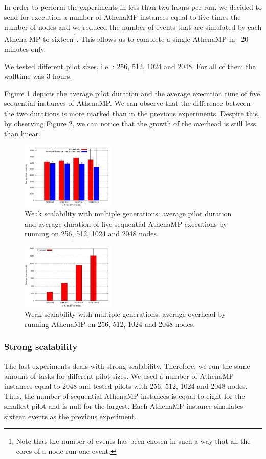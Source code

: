 In order to perform the experiments in less than two hours per run, we decided to send for execution a number of AthenaMP instances equal to five times the number of nodes and we reduced  the number of events that are simulated by each Athena-MP to sixteen\footnote{Note that the number of events has been chosen in such a way that all the cores of a node run one event.}. This allows us to complete a single AthenaMP in ~20 minutes only. 

We tested different pilot sizes, i.e. : 256, 512, 1024 and 2048. For all of them the walltime was 3 hours. 

Figure \ref{fig:weakScal2a} depicts the average pilot duration and  the average execution time of five sequential instances of AthenaMP.  
We can observe that the difference between the two durations is more marked than in the previous experiments. Despite this, by observing Figure \ref{fig:weakScal2b}, we can notice that the growth of the overhead is still less than linear.

\begin{figure}[!htb]
        \includegraphics[width=0.4\textwidth]{./figures/NGE/weakET2.pdf}
    \caption{Weak scalability with multiple generations: average pilot duration and average duration of five sequential AthenaMP executions by running on 256, 512, 1024 and 2048 nodes.}
\label{fig:weakScal2a}
\end{figure}
\begin{figure}[!htb]
        \includegraphics[width=0.4\textwidth]{./figures/NGE/weakOver2.pdf}
    \caption{Weak scalability with multiple generations: average overhead by running AthenaMP on 256, 512, 1024 and 2048 nodes.}
\label{fig:weakScal2b}
\end{figure}
\subsubsection{Strong scalability}
The last experiments deals with strong scalability. Therefore, we run the same amount of tasks for different pilot sizes. 
We used a number of AthenaMP instances equal to 2048 and tested pilots with 256, 512, 1024 and 2048 nodes. Thus, the number of sequential AthenaMP instances is equal to eight for the smallest pilot and is null for the largest.  
Each AthenaMP instance simulates sixteen events as the previous experiment.

